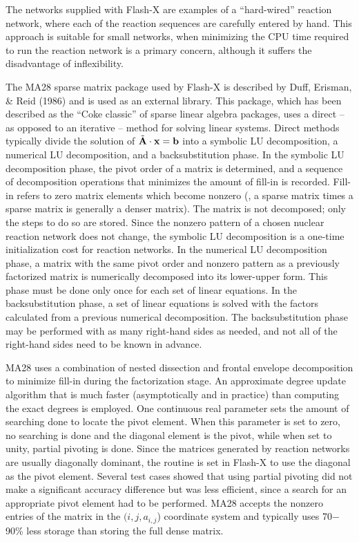 
The networks supplied with Flash-X are examples of a ``hard-wired'' reaction
network, where each of the reaction sequences are carefully entered
by hand.  This approach is suitable for small networks, when minimizing
the CPU time required to run the reaction network is a primary
concern, although it suffers the disadvantage of inflexibility.

The MA28 sparse matrix package used by Flash-X is described by Duff,
Erisman, \& Reid (1986) and is used as an external library.  This package, which has been described
as the ``Coke classic'' of sparse linear algebra packages, uses a direct
-- as opposed to an iterative -- method for solving linear systems.  Direct
methods typically divide the solution of $\tilde{{\bf A}} \cdot {\bf
x} = {\bf b}$ into a symbolic LU decomposition, a numerical LU
decomposition, and a backsubstitution phase.  In the symbolic LU
decomposition phase, the pivot order of a matrix is determined, and a
sequence of decomposition operations that minimizes the amount of
fill-in is recorded. Fill-in refers to zero matrix elements which
become nonzero (\eg, a sparse matrix times a sparse matrix is
generally a denser matrix).  The matrix is not decomposed; only the
steps to do so are stored. Since the nonzero pattern of a chosen
nuclear reaction network does not change, the symbolic LU
decomposition is a one-time initialization cost for reaction networks.
In the numerical LU decomposition phase, a matrix with the same pivot
order and nonzero pattern as a previously factorized matrix is
numerically decomposed into its lower-upper form.  This phase must be
done only once for each set of linear equations.  In the
backsubstitution phase, a set of linear equations is solved with the
factors calculated from a previous numerical decomposition.  The
backsubstitution phase may be performed with as many right-hand sides
as needed, and not all of the right-hand sides need to be known in
advance.

MA28 uses a combination of nested dissection and frontal envelope
decomposition to minimize fill-in during the factorization stage.  An
approximate degree update algorithm that is much faster
(asymptotically and in practice) than computing the exact degrees is
employed.  One continuous real parameter sets the amount of searching
done to locate the pivot element. When this parameter is set to zero,
no searching is done and the diagonal element is the pivot, while when
set to unity, partial pivoting is done.  Since the matrices
generated by reaction networks are usually diagonally dominant, the
routine is set in Flash-X to use the diagonal as the pivot
element. Several test cases showed that using partial pivoting did not
make a significant accuracy difference but was less efficient, since
a search for an appropriate pivot element had to be performed.  MA28
accepts the nonzero entries of the matrix in the \hbox{$(i, j,
a_{i,j}$)} coordinate system and typically uses 70$-$90\% less
storage than storing the full dense matrix.


